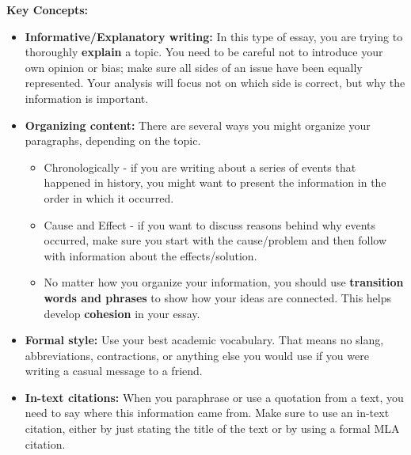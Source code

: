 \documentclass[12pt]{article}
\begin{document}
\begin{tcolorbox}[colframe=black!60, colback=white, 
coltitle=black, colbacktitle=black!15, fonttitle=\bfseries\Large, 
title=Key Concepts and Vocabulary, halign title=center, left=10pt, right=10pt, top=10pt, bottom=15pt]
\textbf{Key Concepts:}
\begin{itemize}
    \item \textbf{Informative/Explanatory writing:} In this type of essay, you are trying to thoroughly \textbf{explain} a topic. You need to be careful not to introduce your own opinion or bias; make sure all sides of an issue have been equally represented. Your analysis will focus not on which side is correct, but why the information is important.
    \item \textbf{Organizing content:} There are several ways you might organize your paragraphs, depending on the topic.
    \begin{itemize}
        \item Chronologically - if you are writing about a series of events that happened in history, you might want to present the information in the order in which it occurred.
        \item Cause and Effect - if you want to discuss reasons behind why events occurred, make sure you start with the cause/problem and then follow with information about the effects/solution.
        \item No matter how you organize your information, you should use \textbf{transition words and phrases} to show how your ideas are connected. This helps develop \textbf{cohesion} in your essay.
    \end{itemize}
    \item \textbf{Formal style:} Use your best academic vocabulary. That means no slang, abbreviations, contractions, or anything else you would use if you were writing a casual message to a friend. 
    \item \textbf{In-text citations:} When you paraphrase or use a quotation from a text, you need to say where this information came from. Make sure to use an in-text citation, either by just stating the title of the text or by using a formal MLA citation.

    \end{itemize}



\end{tcolorbox}
\end{document}
